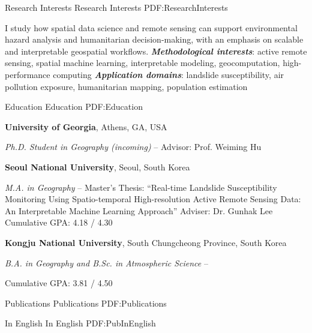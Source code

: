 \documentclass[letterpaper,MMMyyyy,nonstopmode]{simpleresumecv}
\begin{document}
\begin{Body}


\Section
{Research Interests}
{Research Interests}
{PDF:ResearchInterests}

\Entry
I study how spatial data science and remote sensing can support environmental hazard analysis
and humanitarian decision-making, with an emphasis on scalable and interpretable geospatial workflows.
\Gap
\textbf{\textit{Methodological interests}}: active remote sensing, spatial machine learning,
interpretable modeling, geocomputation, high-performance computing
\Gap
\textbf{\textit{Application domains}}: landslide susceptibility, air pollution exposure,
humanitarian mapping, population estimation
\BigGap



\Section
{Education}
{Education}
{PDF:Education}

\Entry
{\textbf{University of Georgia}},
Athens, GA, USA

\Gap
\textit{       Ph.D. Student in Geography (incoming)}
\hfill
{} --
\Gap
\SubBulletItem
Advisor: Prof. Weiming Hu

\BigGap
\Entry
{\textbf{Seoul National University}},
Seoul, South Korea

\Gap
\textit{       M.A. in Geography}
\hfill
{} --
\Gap
\SubBulletItem
Master's Thesis: ``Real-time Landslide Susceptibility Monitoring Using Spatio-temporal High-resolution Active Remote Sensing Data: An Interpretable Machine Learning Approach''
\Gap
\SubBulletItem
Adviser: Dr. Gunhak Lee
\Gap
\SubBulletItem
Cumulative GPA: 4.18 / 4.30

\BigGap
\Entry
{\textbf{Kongju National University}},
South Chungcheong Province, South Korea

\Gap
\textit{       B.A. in Geography and B.Sc. in Atmospheric Science}
\hfill
{} --

\Gap
\SubBulletItem
Cumulative GPA: 3.81 / 4.50


\Section
{Publications}
{Publications}
{PDF:Publications}

\SubSection
{In English}
{In English}
{PDF:PubInEnglish}


\BigGap


\end{Body}
\end{document}
